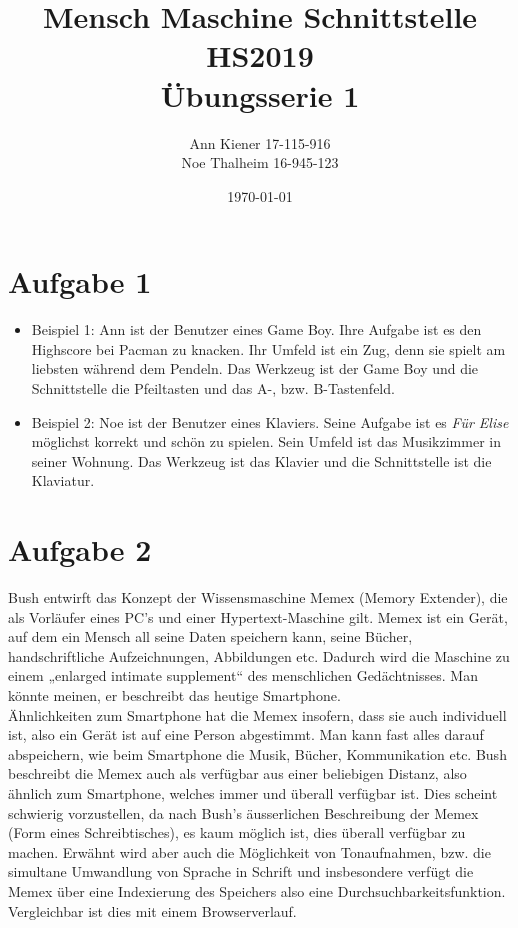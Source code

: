 \documentclass{article}
\begin{document}
    \title{Mensch Maschine Schnittstelle \\ HS2019 \\ Übungsserie 1}
    \date{\today}
    \author{Ann Kiener 17-115-916 \\ Noe Thalheim 16-945-123}
    \maketitle

    \section{Aufgabe 1}
    \begin{itemize}
        \item Beispiel 1: Ann ist der Benutzer eines Game Boy. Ihre Aufgabe ist es 
        den Highscore bei Pacman zu knacken. Ihr Umfeld ist ein Zug, denn sie spielt
        am liebsten während dem Pendeln. Das Werkzeug ist der Game Boy und die
        Schnittstelle die Pfeiltasten und das A-, bzw. B-Tastenfeld.
        \item Beispiel 2: Noe ist der Benutzer eines Klaviers. Seine Aufgabe ist es
        \textit{Für Elise} möglichst korrekt und schön zu spielen. Sein Umfeld ist
        das Musikzimmer in seiner Wohnung. Das Werkzeug ist das Klavier und die 
        Schnittstelle ist die Klaviatur.
    \end{itemize}

    \section{Aufgabe 2}
   Bush entwirft das Konzept der Wissensmaschine Memex (Memory Extender), 
    die als Vorläufer eines PC's und einer Hypertext-Maschine gilt. Memex ist ein Gerät,
    auf dem ein Mensch all seine Daten speichern kann, seine Bücher, handschriftliche Aufzeichnungen, Abbildungen etc.
     Dadurch wird die Maschine zu einem „enlarged intimate supplement“ des menschlichen Gedächtnisses. Man könnte meinen,
     er beschreibt das heutige Smartphone.\\
     Ähnlichkeiten zum Smartphone hat die Memex insofern, dass sie auch individuell ist,
     also ein Gerät ist auf eine Person abgestimmt. Man kann fast alles darauf abspeichern,
     wie beim Smartphone die Musik, Bücher, Kommunikation etc. 
     Bush beschreibt die Memex auch als verfügbar aus einer beliebigen Distanz, also ähnlich
     zum Smartphone, welches immer und überall verfügbar ist. Dies scheint schwierig vorzustellen,
     da nach Bush's äusserlichen Beschreibung der Memex (Form eines Schreibtisches), es kaum möglich ist,
     dies überall verfügbar zu machen. 
     Erwähnt wird aber auch die Möglichkeit von Tonaufnahmen, bzw. die simultane Umwandlung von Sprache in Schrift und insbesondere
     verfügt die Memex über eine Indexierung des Speichers also eine Durchsuchbarkeitsfunktion. Vergleichbar
     ist dies mit einem Browserverlauf.
    
\end{document}
